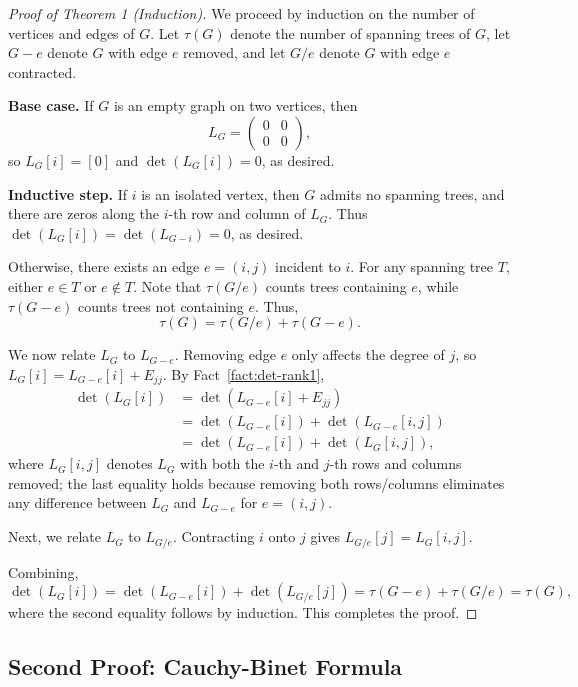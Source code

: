 \documentclass[12pt]{article}
\theoremstyle{remark}
\begin{document}
\begin{proof}[Proof of Theorem 1 (Induction)]
We proceed by induction on the number of vertices and edges of $G$. Let $\tau(G)$ denote
the number of spanning trees of $G$, let $G - e$ denote $G$ with edge $e$ removed, and
let $G/e$ denote $G$ with edge $e$ contracted.

\medskip
\noindent\textbf{Base case.} If $G$ is an empty graph on two vertices, then
\[
  L_G = \begin{pmatrix} 0 & 0 \\ 0 & 0 \end{pmatrix},
\]
so $L_G[i] = [0]$ and $\det(L_G[i]) = 0$, as desired.

\medskip
\noindent\textbf{Inductive step.} If $i$ is an isolated vertex, then $G$ admits no spanning
trees, and there are zeros along the $i$-th row and column of $L_G$. Thus
$\det(L_G[i]) = \det(L_{G-i}) = 0$, as desired.

Otherwise, there exists an edge $e = (i,j)$ incident to $i$. For any spanning tree $T$,
either $e \in T$ or $e \notin T$. Note that $\tau(G/e)$ counts trees containing $e$, while
$\tau(G - e)$ counts trees not containing $e$. Thus,
\[
  \tau(G) = \tau(G/e) + \tau(G - e).
\]

We now relate $L_G$ to $L_{G-e}$. Removing edge $e$ only affects the degree of $j$, so
$L_G[i] = L_{G-e}[i] + E_{jj}$. By Fact~\ref{fact:det-rank1},
\begin{align*}
  \det(L_G[i]) &= \det(L_{G-e}[i] + E_{jj}) \\
               &= \det(L_{G-e}[i]) + \det(L_{G-e}[i,j]) \\
               &= \det(L_{G-e}[i]) + \det(L_G[i,j]),
\end{align*}
where $L_G[i,j]$ denotes $L_G$ with both the $i$-th and $j$-th rows and columns removed;
the last equality holds because removing both rows/columns eliminates any difference between
$L_G$ and $L_{G-e}$ for $e = (i,j)$.

Next, we relate $L_G$ to $L_{G/e}$. Contracting $i$ onto $j$ gives
$L_{G/e}[j] = L_G[i,j]$.

Combining,
\[
  \det(L_G[i]) = \det(L_{G-e}[i]) + \det(L_{G/e}[j])
               = \tau(G - e) + \tau(G/e) = \tau(G),
\]
where the second equality follows by induction. This completes the proof.
\end{proof}

\subsection*{Second Proof: Cauchy-Binet Formula}
\end{document}
